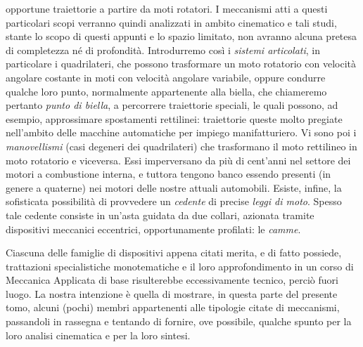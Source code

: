 opportune traiettorie a partire da moti rotatori.
I meccanismi  atti a questi particolari scopi verranno
quindi analizzati in ambito cinematico e tali studi, stante lo scopo di questi
appunti e lo spazio limitato, non avranno alcuna pretesa di completezza n\'e di
profondit\`a.
Introdurremo cos\`i i {\em sistemi articolati}, in particolare i quadrilateri, che possono trasformare 
un moto rotatorio con velocit\`a angolare costante in moti
con velocit\`a angolare variabile, oppure condurre qualche loro
punto, normalmente appartenente alla biella, che chiameremo pertanto {\em punto
di biella}, a percorrere traiettorie
speciali, le quali possono, ad esempio, approssimare
spostamenti rettilinei: traiettorie
queste molto pregiate nell'ambito delle macchine automatiche 
per impiego manifatturiero. 
Vi sono poi i {\em manovellismi} (casi degeneri dei
quadrilateri) che trasformano il moto rettilineo in  moto
rotatorio e viceversa. Essi imperversano da pi\`u di cent'anni nel
settore dei motori a combustione interna, e tuttora tengono banco essendo
presenti (in genere a quaterne) nei motori delle nostre attuali automobili.
\noindent Esiste, infine, la sofisticata possibilit\`a di
provvedere un {\em cedente} di precise
{\em leggi di moto}.
Spesso tale cedente consiste in un'asta guidata da due collari,
azionata tramite dispositivi meccanici
eccentrici, opportunamente profilati: le {\em camme}.


\noindent Ciascuna delle famiglie di dispositivi appena
citati merita, e di fatto possiede, trattazioni
specialistiche monotematiche e il loro approfondimento in un corso di Meccanica
Applicata di base risulterebbe eccessivamente tecnico, perci\`o fuori luogo.
La nostra intenzione \`e quella di mostrare, in questa parte del presente tomo,
alcuni (pochi) membri appartenenti alle tipologie citate di meccanismi,
passandoli in rassegna e tentando di fornire,
ove possibile, qualche spunto per la loro analisi cinematica e per 
la loro sintesi.






